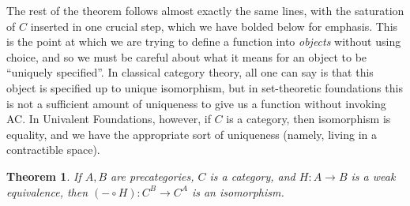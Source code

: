 \documentclass{amsart}
\newtheorem{thm}{Theorem}[section]
\theoremstyle{definition}
\theoremstyle{remark}
\numberwithin{equation}{section}
\begin{document}
The rest of the theorem follows almost exactly the same lines, with the saturation of $C$ inserted in one crucial step, which we have bolded below for emphasis.
This is the point at which we are trying to define a function into \emph{objects} without using choice, and so we must be careful about what it means for an object to be ``uniquely specified''.
In classical category theory, all one can say is that this object is specified up to unique isomorphism, but in set-theoretic foundations this is not a sufficient amount of uniqueness to give us a function without invoking AC.
In Univalent Foundations, however, if $C$ is a category, then isomorphism is equality, and we have the appropriate sort of uniqueness (namely, living in a contractible space).

\begin{thm}\label{ct:cat-weq-eq}
  If $A,B$ are precategories, $C$ is a category, and $H:A\to B$ is a weak equivalence, then $(-\circ H):C^B \to C^A$ is an isomorphism.
\end{thm}
\end{document}
